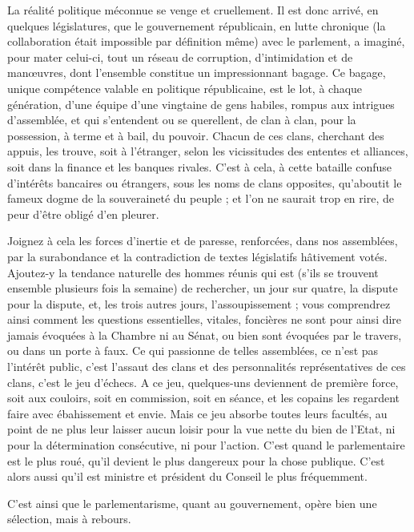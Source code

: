 \documentclass[french,twoside]{book} %
\begin{document}
La réalité politique méconnue se venge et cruellement. Il est donc arrivé, en quelques législatures, que le gouvernement républicain, en lutte chronique (la collaboration était impossible par définition même) avec le parlement, a imaginé, pour mater celui-ci, tout un réseau de corruption, d’intimidation et de manœuvres, dont l’ensemble constitue un impressionnant bagage. Ce bagage, unique compétence valable en politique républicaine, est le lot, à chaque génération, d’une équipe d’une vingtaine de gens habiles, rompus aux intrigues d’assemblée, et qui s’entendent ou se querellent, de clan à clan, pour la possession, à terme et à bail, du pouvoir. Chacun de ces clans, cherchant des appuis, les trouve, soit à l’étranger, selon les vicissitudes des ententes et alliances, soit dans la finance et les banques rivales. C’est à cela, à cette bataille confuse d’intérêts bancaires ou étrangers, sous les noms de clans opposites, qu’aboutit le fameux dogme de la souveraineté du peuple ; et l’on ne saurait trop en rire, de peur d’être obligé d’en pleurer.\par
Joignez à cela les forces d’inertie et de paresse, renforcées, dans nos assemblées, par la surabondance et la contradiction de textes législatifs hâtivement votés. Ajoutez-y la tendance naturelle des hommes réunis qui est (s’ils se trouvent ensemble plusieurs fois la semaine) de rechercher, un jour sur quatre, la dispute pour la dispute, et, les trois autres jours, l’assoupissement ; vous comprendrez ainsi comment les questions essentielles, vitales, foncières ne sont pour ainsi dire jamais évoquées à la Chambre ni au Sénat, ou bien sont évoquées par le travers, ou dans un porte à faux. Ce qui passionne de telles assemblées, ce n’est pas l’intérêt public, c’est l’assaut des clans et des personnalités représentatives de ces clans, c’est le jeu d’échecs. A ce jeu, quelques-uns deviennent de première force, soit aux couloirs, soit en commission, soit en séance, et les copains les regardent faire avec ébahissement et envie. Mais ce jeu absorbe toutes leurs facultés, au point de ne plus leur laisser aucun loisir pour la vue nette du bien de l’Etat, ni pour la détermination consécutive, ni pour l’action. C’est quand le parlementaire est le plus roué, qu’il devient le plus dangereux pour la chose publique. C’est alors aussi qu’il est ministre et président du Conseil le plus fréquemment.\par
C’est ainsi que le parlementarisme, quant au gouvernement, opère bien une sélection, mais à rebours.\par
\end{document}
